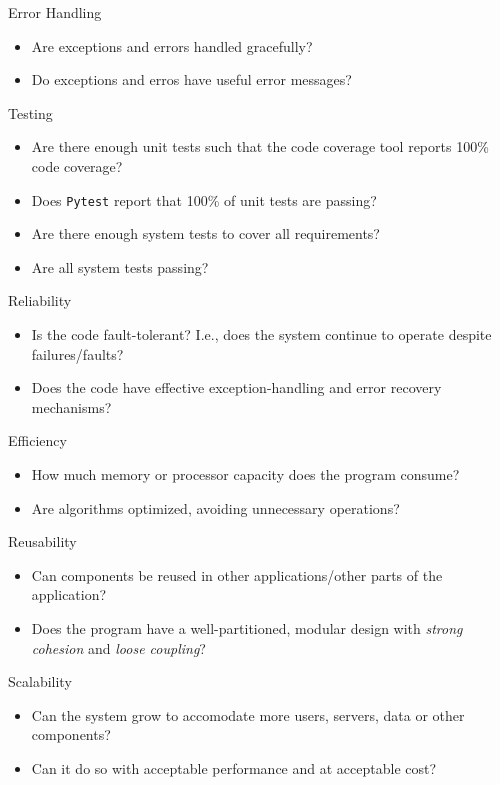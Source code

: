 \documentclass[12pt, titlepage]{article}
\begin{document}
\noindent
Error Handling
\begin{itemize}[label=$\square$]
  \item Are exceptions and errors handled gracefully?
  \item Do exceptions and erros have useful error messages? 
\end{itemize}

\noindent
Testing
\begin{itemize}[label=$\square$]
  \item Are there enough unit tests such that the code coverage tool reports 100\% code coverage?
  \item Does \texttt{Pytest} report that 100\% of unit tests are passing? 
  \item Are there enough system tests to cover all requirements? 
  \item Are all system tests passing? 
\end{itemize}

\noindent
Reliability
\begin{itemize}[label=$\square$]
  \item Is the code fault-tolerant? I.e., does the system continue to operate despite failures/faults?
  \item Does the code have effective exception-handling and error recovery mechanisms?
\end{itemize}

\noindent
Efficiency
\begin{itemize}[label=$\square$]
  \item How much memory or processor capacity does the program consume?
  \item Are algorithms optimized, avoiding unnecessary operations?
\end{itemize}

\noindent
Reusability
\begin{itemize}[label=$\square$]
  \item Can components be reused in other applications/other parts of the application?
  \item Does the program have a well-partitioned, modular design with \emph{strong cohesion} and \emph{loose coupling}?
\end{itemize}

\noindent
Scalability
\begin{itemize}[label=$\square$]
  \item Can the system grow to accomodate more users, servers, data or other components?
  \item Can it do so with acceptable performance and at acceptable cost?
\end{itemize}
\end{document}
